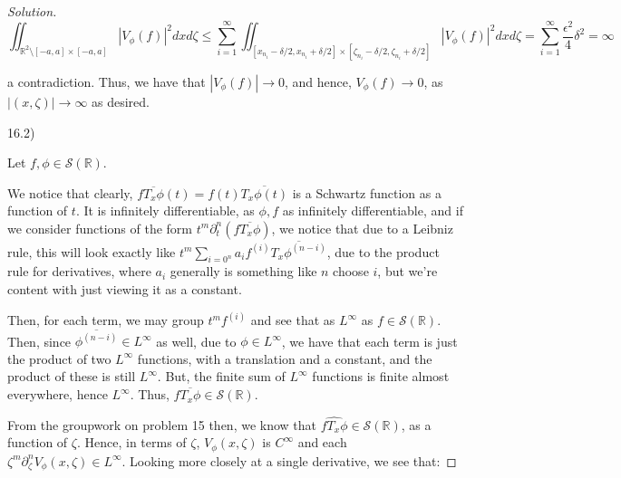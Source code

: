 \documentclass[10pt]{article}
\begin{document}
\begin{proof}[Solution]
$$ \iint_{\mathbb{R}^2 \setminus [-a,a] \times [-a,a]} |V_\phi(f)|^2 dx d\zeta \leq \sum_{i=1}^\infty \iint_{[x_{n_i} - \delta/2, x_{n_i} + \delta/2] \times [\zeta_{n_i} - \delta/2, \zeta_{n_i} + \delta/2]} | V_\phi(f)|^2 dx d\zeta = \sum_{i=1}^\infty \frac{\epsilon^2}{4} \delta^2 = \infty$$

a contradiction. Thus, we have that $|V_\phi(f)| \to 0$, and hence, $V_\phi(f) \to 0$, as $|(x, \zeta)| \to \infty$ as desired.




16.2)

Let $f, \phi \in \mathcal{S}(\mathbb{R})$. %



We notice that clearly, $f \overline{T_x \phi} (t) = f(t)\overline{ T_x \phi (t)}$ is a Schwartz function as a function of $t$. It is infinitely differentiable, as $\phi, f$ as infinitely differentiable, and if we consider functions of the form $t^m \partial^n_t (f \overline{T_x \phi} )$, we notice that due to a Leibniz rule, this will look exactly like $t^m \sum_{i=0^n} a_i f^{(i)}\overline{ T_x \phi^{(n-i)}}$, due to the product rule for derivatives, where $a_i$ generally is something like $n$ choose $i$, but we're content with just viewing it as a constant.

Then, for each term, we may group $t^m f^{(i)}$ and see that as $L^\infty$ as $f \in \mathcal{S}(\mathbb{R})$. Then, since $\overline{\phi^{(n-i)}} \in L^\infty$ as well, due to $\phi \in L^\infty$, we have that each term is just the product of two $L^\infty$ functions, with a translation and a constant, and the product of these is still $L^\infty$. But, the finite sum of $L^\infty$ functions is finite almost everywhere, hence $L^\infty$. Thus, $f \overline{T_x \phi} \in \mathcal{S}(\mathbb{R})$.

From the groupwork on problem 15 then, we know that $\widehat{f T_x \phi} \in \mathcal{S}(\mathbb{R})$, as a function of $\zeta$. Hence, in terms of $\zeta$, $V_\phi(x, \zeta)$ is $C^\infty$ and each $\zeta^m \partial^n_\zeta V_\phi(x, \zeta) \in L^\infty$. Looking more closely at a single derivative, we see that:


\end{proof}
\end{document}
